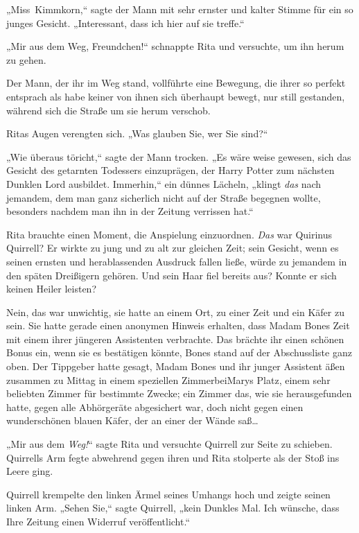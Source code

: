 {„Miss~Kimmkorn,“ sagte der Mann mit sehr ernster und kalter Stimme für ein so junges Gesicht. „Interessant, dass ich hier auf sie treffe.“

„Mir aus dem Weg, Freundchen!“ schnappte Rita und versuchte, um ihn herum zu gehen.

Der Mann, der ihr im Weg stand, vollführte eine Bewegung, die ihrer so perfekt entsprach als habe keiner von ihnen sich überhaupt bewegt, nur still gestanden, während sich die Straße um sie herum verschob.

Ritas Augen verengten sich. „Was glauben Sie, wer Sie sind?“

„Wie überaus töricht,“ sagte der Mann trocken. „Es wäre weise gewesen, sich das Gesicht des getarnten Todessers einzuprägen, der Harry Potter zum nächsten Dunklen Lord ausbildet. Immerhin,“ ein dünnes Lächeln, „klingt \emph{das} nach jemandem, dem man ganz sicherlich nicht auf der Straße begegnen wollte, besonders nachdem man ihn in der Zeitung verrissen hat.“

Rita brauchte einen Moment, die Anspielung einzuordnen. \emph{Das} war Quirinus Quirrell? Er wirkte zu jung und zu alt zur gleichen Zeit; sein Gesicht, wenn es seinen ernsten und herablassenden Ausdruck fallen ließe, würde zu jemandem in den späten Dreißigern gehören. Und sein Haar fiel bereits aus? Konnte er sich keinen Heiler leisten?

Nein, das war unwichtig, sie hatte an einem Ort, zu einer Zeit und ein Käfer zu sein. Sie hatte gerade einen anonymen Hinweis erhalten, dass Madam Bones Zeit mit einem ihrer jüngeren Assistenten verbrachte. Das brächte ihr einen schönen Bonus ein, wenn sie es bestätigen könnte, Bones stand auf der Abschussliste ganz oben. Der Tippgeber hatte gesagt, Madam Bones und ihr junger Assistent äßen zusammen zu Mittag in einem speziellen ZimmerbeiMarys Platz, einem sehr beliebten Zimmer für bestimmte Zwecke; ein Zimmer das, wie sie herausgefunden hatte, gegen alle Abhörgeräte abgesichert war, doch nicht gegen einen wunderschönen blauen Käfer, der an einer der Wände saß…

„Mir aus dem \emph{Weg!}“ sagte Rita und versuchte Quirrell zur Seite zu schieben. Quirrells Arm fegte abwehrend gegen ihren und Rita stolperte als der Stoß ins Leere ging.

Quirrell krempelte den linken Ärmel seines Umhangs hoch und zeigte seinen linken Arm. „Sehen Sie,“ sagte Quirrell, „kein Dunkles Mal. Ich wünsche, dass Ihre Zeitung einen Widerruf veröffentlicht.“

}
